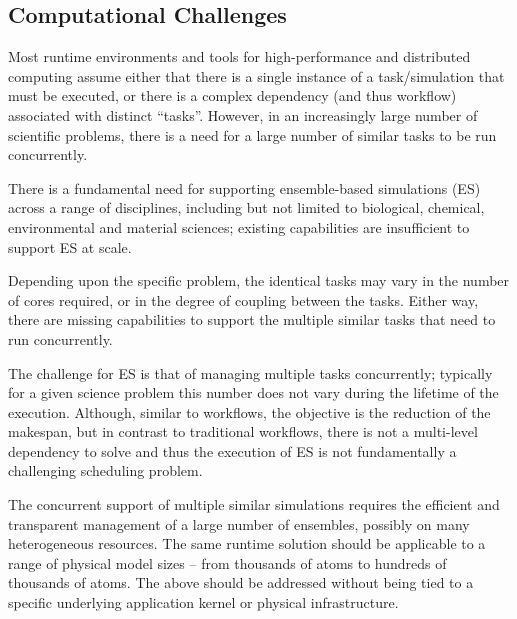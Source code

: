 \documentclass{sig-alternate}
\begin{document}
\subsection{Computational Challenges}

Most runtime environments and tools for high-performance and
distributed computing assume either that there is a single instance of
a task/simulation that must be executed, or there is a complex
dependency (and thus workflow) associated with distinct ``tasks''.
However, in an increasingly large number of scientific problems, there
is a need for a large number of similar tasks to be run concurrently.

There is a fundamental need for supporting ensemble-based simulations
(ES) across a range of disciplines, including but not limited to
biological, chemical, environmental and material sciences; existing
capabilities are insufficient to support ES at scale. 

Depending upon the specific problem, the identical tasks may vary in
the number of cores required, or in the degree of coupling between the
tasks.  Either way, there are missing capabilities to support the
multiple similar tasks that need to run concurrently.




The challenge for ES is that of managing multiple tasks concurrently;
typically for a given science problem this number does not vary during
the lifetime of the execution. Although, similar to workflows, the
objective is the reduction of the makespan, but in contrast to
traditional workflows, there is not a multi-level dependency to solve
and thus the execution of ES is not fundamentally a challenging
scheduling problem.

The concurrent support of multiple similar simulations requires the
efficient and transparent management of a large number of ensembles,
possibly on many heterogeneous resources. The same runtime solution
should be applicable to a range of physical model sizes -- from
thousands of atoms to hundreds of thousands of atoms.%
The above should be addressed without being tied to a specific
underlying application kernel or physical infrastructure. 
 
\end{document}
